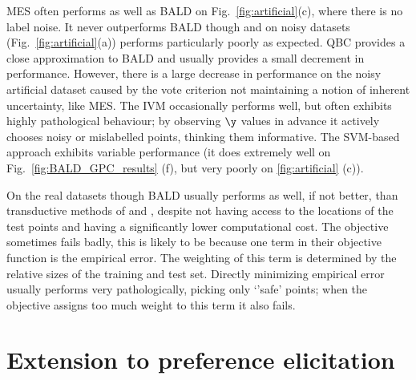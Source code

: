 MES often performs as well as BALD \eg on Fig.\ \ref{fig:artificial}(c), where there is no label noise. It never outperforms BALD though and on noisy datasets (\eg Fig.\ \ref{fig:artificial}(a)) performs particularly poorly as expected. QBC provides a close approximation to BALD and usually provides a small decrement in performance. However, there is a large decrease in performance on the noisy artificial dataset caused by the vote criterion not maintaining a notion of inherent uncertainty, like MES. The IVM occasionally performs well, but often exhibits highly pathological behaviour; by observing $\y$ values in advance it actively chooses noisy or mislabelled points, thinking them informative. The SVM-based approach exhibits variable performance (it does extremely well on Fig.\ \ref{fig:BALD_GPC_results} (f), but very poorly on \ref{fig:artificial} (c)).

On the real datasets though BALD usually performs as well, if not better, than transductive methods of \citet{Kapoor2007} and \citet{Zhu2003}, despite not having access to the locations of the test points and having a significantly lower computational cost. The \citep{Kapoor2007} objective sometimes fails badly, this is likely to be because one term in their objective function is the empirical error. The weighting of this term is determined by the relative sizes of the training and test set. Directly minimizing empirical error usually performs very pathologically, picking only `'safe' points; when the \citep{Kapoor2007} objective assigns too much weight to this term it also fails.


\section{Extension to preference elicitation}

